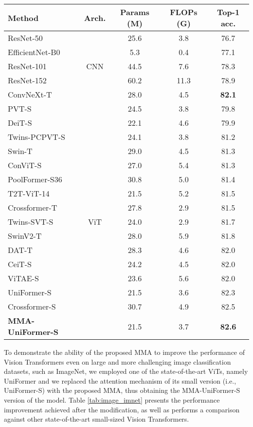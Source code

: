 \documentclass[10pt,twocolumn,letterpaper]{article}
\begin{document}
\begin{table*}[t]
\centering
\caption{Comparative evaluation on ImageNet with images of size .}
\label{tab:image_imnet}
\setlength{\tabcolsep}{24pt}
\begin{tabular}{lcccc}
\hline
\textbf{Method}  & \textbf{Arch.} & \textbf{Params (M)} & \textbf{FLOPs (G)} & \textbf{Top-1 acc.}\\
\hline
ResNet-50 \cite{Author61} & & 25.6 & 3.8 & 76.7 \\
EfficientNet-B0 \cite{Author39} & & 5.3 & 0.4 & 77.1 \\
ResNet-101 \cite{Author61} & CNN & 44.5 & 7.6 & 78.3 \\
ResNet-152 \cite{Author61} & & 60.2 & 11.3 & 78.9 \\
ConvNeXt-T \cite{Author62} & & 28.0 & 4.5 & \textbf{82.1} \\
\hline
PVT-S \cite{Author10} & & 24.5 & 3.8 & 79.8\\
DeiT-S \cite{Author4} & & 22.1 & 4.6 & 79.9\\
Twins-PCPVT-S \cite{Author66} & & 24.1 & 3.8 & 81.2\\
Swin-T \cite{Author9} & & 29.0 & 4.5 & 81.3\\
ConViT-S \cite{Author5} & & 27.0 & 5.4 & 81.3\\
PoolFormer-S36 \cite{Author63} & & 30.8 & 5.0 & 81.4\\
T2T-ViT-14 \cite{Author8} & & 21.5 & 5.2 & 81.5\\
Crossformer-T \cite{Author64} & & 27.8 & 2.9 & 81.5\\
Twins-SVT-S \cite{Author66} & ViT & 24.0 & 2.9 & 81.7\\
SwinV2-T \cite{Author65} & & 28.0 & 5.9 & 81.8\\
DAT-T \cite{Author67} & & 28.3 & 4.6 & 82.0\\
CeiT-S \cite{Author6} & & 24.2 & 4.5 & 82.0\\
ViTAE-S \cite{Author56} & & 23.6 & 5.6 & 82.0\\
UniFormer-S \cite{Author57} & & 21.5 & 3.6 & 82.3\\
Crossformer-S \cite{Author64} & & 30.7 & 4.9 & 82.5\\
\textbf{MMA-UniFormer-S} & & 21.5 & 3.7 & \textbf{82.6}\\
\hline
\end{tabular}
\end{table*}

To demonstrate the ability of the proposed MMA to improve the performance of Vision Transformers even on large and more challenging image classification datasets, such as ImageNet, we employed one of the state-of-the-art ViTs, namely UniFormer \cite{Author57} and we replaced the attention mechanism of its small version (i.e., UniFormer-S) with the proposed MMA, thus obtaining the MMA-UniFormer-S version of the model. Table \ref{tab:image_imnet} presents the performance improvement achieved after the modification, as well as performs a comparison against other state-of-the-art small-sized Vision Transformers.
\end{document}
